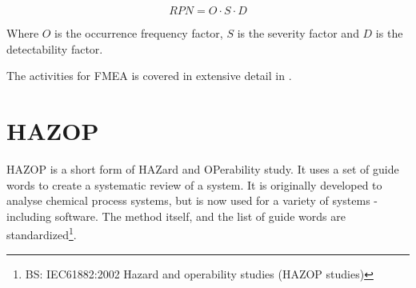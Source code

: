 \documentclass[10pt,oneside]{book}                  %
\begin{document}
\begin{equation}
RPN = O \cdot S \cdot D
\end{equation}

Where $O$ is the occurrence frequency factor, $S$ is the severity factor and $D$ is the detectability factor.

The activities for FMEA is covered in extensive detail in \cite{MILSTD1629A}.








\section{HAZOP}
HAZOP is a short form of HAZard and OPerability study. It uses a set of guide words to create a systematic review of a system. It is originally developed to analyse chemical process systems, but is now used for a variety of systems - including software. The method itself, and the list of guide words are standardized\footnote{BS: IEC61882:2002 Hazard and operability studies (HAZOP studies)}.
\end{document}
